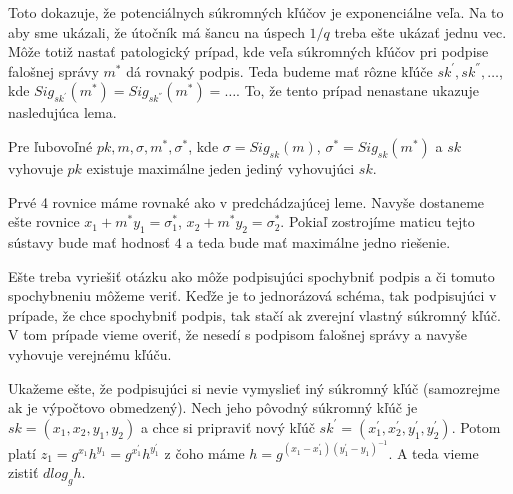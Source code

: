 Toto dokazuje, že potenciálnych súkromných kľúčov je exponenciálne veľa.
Na to aby sme ukázali, že útočník má
šancu na úspech $1/q$ treba ešte ukázať jednu vec.
Môže totiž nastať patologický prípad, kde veľa súkromných kľúčov
pri podpise falošnej správy $m^*$ dá rovnaký podpis.
Teda budeme mať rôzne kľúče $sk^{'}, sk^{''}, \dots$,
kde $Sig_{sk^{'}}(m^*) = Sig_{sk^{''}}(m^*) = \dots$.
To, že tento prípad nenastane ukazuje nasledujúca lema.

\begin{lema}
Pre ľubovoľné $pk, m, \sigma, m^*, \sigma^*$, kde $\sigma = Sig_{sk}(m)$, $\sigma^* = Sig_{sk}(m^*)$ a $sk$ vyhovuje $pk$
existuje maximálne jeden jediný vyhovujúci $sk$.
\end{lema}

\begin{dokaz}
Prvé 4 rovnice máme rovnaké ako v predchádzajúcej leme. Navyše dostaneme ešte rovnice $x_1 + m^*y_1 = \sigma_1^*$, 
$x_2 + m^* y_2 = \sigma_2^*$.
Pokiaľ zostrojíme maticu tejto sústavy bude mať hodnosť $4$ a teda bude mať maximálne jedno riešenie.
\end{dokaz}


Ešte treba vyriešiť otázku ako môže podpisujúci spochybniť podpis 
a či tomuto spochybneniu môžeme veriť.
Keďže je to jednorázová schéma, tak podpisujúci v prípade,
že chce spochybniť podpis, tak stačí ak zverejní vlastný súkromný kľúč.
V tom prípade vieme overiť, že nesedí s podpisom falošnej správy
a navyše vyhovuje verejnému kľúču.

Ukažeme ešte, že podpisujúci si nevie vymyslieť iný súkromný kľúč
(samozrejme ak je výpočtovo obmedzený). 
Nech jeho pôvodný súkromný kľúč je $sk = (x_1, x_2, y_1, y_2)$ a
chce si pripraviť nový kľúč $sk^{'} = (x_1^{'}, x_2^{'}, y_1^{'}, y_2^{'})$.
Potom platí $z_1 = g^{x_1} h^{y_1} = g^{x_1^{'}} h^{y_1^{'}}$ z čoho máme 
$h = g^{(x_1 - x_1^{'})(y_1^{'} - y_1)^{-1}}$.
A teda vieme zistiť $dlog_g h$.


